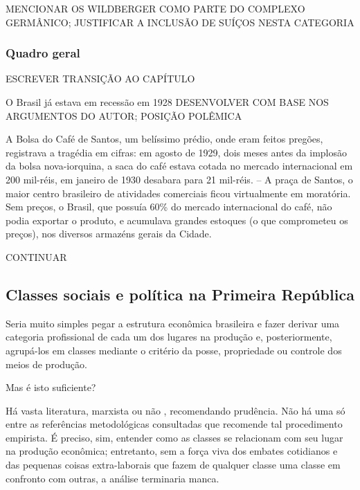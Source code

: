 MENCIONAR OS WILDBERGER COMO PARTE DO COMPLEXO GERMÂNICO; JUSTIFICAR A INCLUSÃO DE SUÍÇOS NESTA CATEGORIA

\subsubsection{Quadro geral}\label{subsubsec:quager}

ESCREVER TRANSIÇÃO AO CAPÍTULO

O Brasil já estava em recessão em 1928 \cite{hautcoeur_1929_2009} DESENVOLVER COM BASE NOS ARGUMENTOS DO AUTOR; POSIÇÃO POLÊMICA

A Bolsa do Café de Santos, um belíssimo prédio, onde eram feitos pregões, registrava a tragédia em cifras: em agosto de 1929, dois meses antes da implosão da bolsa nova-iorquina, a saca do café estava cotada no mercado internacional em 200 mil-réis, em janeiro de 1930 desabara para 21 mil-réis. – A praça de Santos, o maior centro brasileiro de atividades comerciais ficou virtualmente em moratória. Sem preços, o Brasil, que possuía 60\% do mercado internacional do café, não podia exportar o produto, e acumulava grandes estoques (o que comprometeu os preços), nos diversos armazéns gerais da Cidade. \cite{hautcoeur_1929_2009}

CONTINUAR

\subsection{Classes sociais e política na Primeira República}\label{subsec:clapolprire}

Seria muito simples pegar a estrutura econômica brasileira e fazer derivar uma categoria profissional de cada um dos lugares na produção e, posteriormente, agrupá-los em classes mediante o critério da posse, propriedade ou controle dos meios de produção. 

Mas é isto suficiente?

Há vasta literatura, marxista \cite{BERNARDO1991,bernardo_fascismo_2015,ossowski_classes_1964} ou não \cite{aguiar_hierarquias_1974,schumpeter_imperialismo_1961,velho_classes_1977}, recomendando prudência. Não há uma só entre as referências metodológicas consultadas que recomende tal procedimento empirista. É preciso, sim, entender como as classes se relacionam com seu lugar na produção econômica; entretanto, sem a força viva dos embates cotidianos e das pequenas coisas extra-laborais que fazem de qualquer classe uma classe em confronto com outras, a análise terminaria manca.

